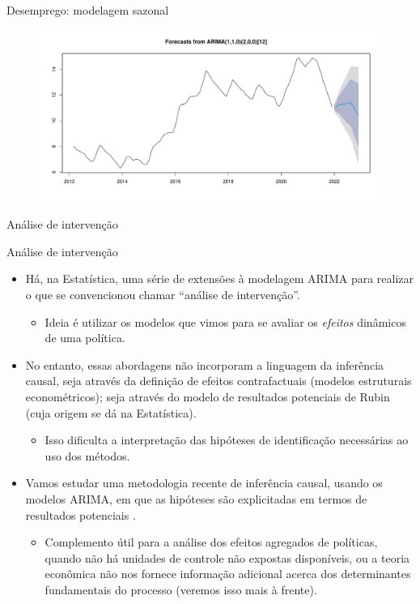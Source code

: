 \documentclass[11pt]{beamer}
\newenvironment{transitionframe}{
	\setbeamercolor{background canvas}{bg=yellow}
	\begin{frame}}{
	\end{frame}
}
\begin{document}
\begin{frame}{Desemprego: modelagem sazonal}
\begin{figure}
	\includegraphics[scale=0.4]{graficos/sarima.pdf}
\end{figure}
		
\end{frame}
\begin{transitionframe}
	\begin{center}
		{\Huge   Análise de intervenção}
	\end{center}
\end{transitionframe}

\begin{frame}{Análise de intervenção}
	\begin{itemize}
		\item Há, na Estatística, uma série de extensões à modelagem ARIMA para realizar o que se convencionou chamar ``análise de intervenção''.
		\begin{itemize}
			\item Ideia é utilizar os modelos que vimos para se avaliar os \emph{efeitos} dinâmicos de uma política.
		\end{itemize}
		\item No entanto, essas abordagens não incorporam a linguagem da inferência causal, seja através da definição de efeitos contrafactuais (modelos estruturais econométricos); seja através do modelo de resultados potenciais de Rubin (cuja origem se dá na Estatística).
		\begin{itemize}
			\item Isso dificulta a interpretação das hipóteses de identificação necessárias ao uso dos métodos.
		\end{itemize} 
		\item Vamos estudar uma metodologia recente de inferência causal, usando os modelos ARIMA, em que as hipóteses são explicitadas em termos de resultados potenciais \citep{Menchetti2022}.
		\begin{itemize}
			\item Complemento útil para a análise dos efeitos agregados de políticas, quando não há unidades de controle não expostas disponíveis, ou a teoria econômica não nos fornece informação adicional acerca dos determinantes fundamentais do processo (veremos isso mais à frente).
		\end{itemize}
	\end{itemize}
\end{frame}
\end{document}
